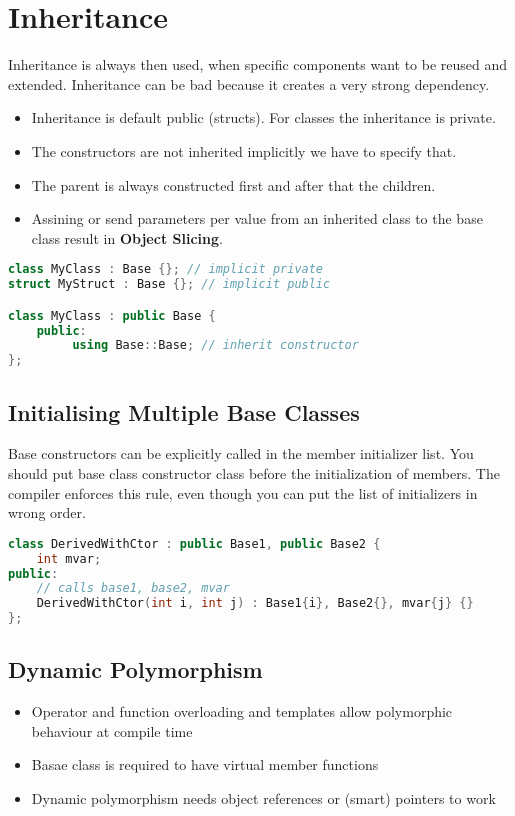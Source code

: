 \section{Inheritance}
Inheritance is always then used, when specific components want to be reused and extended. Inheritance can be bad because it creates a very strong dependency.

\begin{itemize}
  \itemsep -0.5em 
  \item Inheritance is default public (structs). For classes the inheritance is private.
  \item The constructors are not inherited implicitly we have to specify that.
  \item The parent is always constructed first and after that the children.
  \item Assining or send parameters per value from an inherited class to the base class result in \textbf{Object Slicing}.
\end{itemize}

\begin{lstlisting}[language=C++]
class MyClass : Base {}; // implicit private 
struct MyStruct : Base {}; // implicit public 

class MyClass : public Base {
	public:
		 using Base::Base; // inherit constructor
};
\end{lstlisting}

\subsection{Initialising Multiple Base Classes}
 Base constructors can be explicitly called in the member initializer list. You should put base class constructor class before the initialization of members. The compiler enforces this rule, even though you can put the list of initializers in wrong order.
 
 \begin{lstlisting}[language=C++]
class DerivedWithCtor : public Base1, public Base2 {
	int mvar; 
public:
	// calls base1, base2, mvar
	DerivedWithCtor(int i, int j) : Base1{i}, Base2{}, mvar{j} {}
};
\end{lstlisting}

\subsection{Dynamic Polymorphism}
\begin{itemize}
  \itemsep -0.5em 
  \item Operator and function overloading and templates allow polymorphic behaviour at compile time
  \item Basae class is required to have virtual member functions
  \item Dynamic polymorphism needs object references or (smart) pointers to work
\end{itemize}

